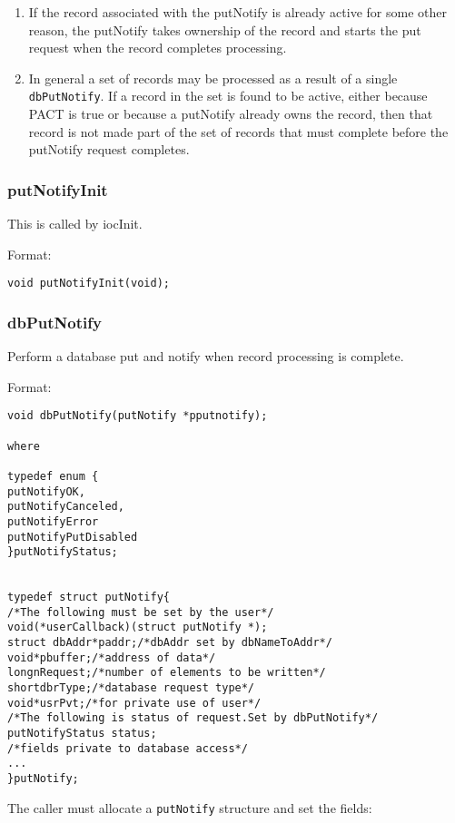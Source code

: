 \begin{enumerate}
\item If the record associated with the putNotify is already active for some other reason, the putNotify takes ownership of 
the record and starts the put request when the record completes processing.

\item In general a set of records may be processed as a result of a single \verb|dbPutNotify|. If a record in the set is found to 
be active, either because PACT is true or because a putNotify already owns the record, then that record is not made 
part of the set of records that must complete before the putNotify request completes.

\end{enumerate}\subsubsection{putNotifyInit}

This is called by iocInit.

Format:

\begin{verbatim}void putNotifyInit(void);
\end{verbatim}\subsubsection{dbPutNotify}

Perform a database put and notify when record processing is complete.

Format:

\begin{verbatim}void dbPutNotify(putNotify *pputnotify);

where

typedef enum {
putNotifyOK,
putNotifyCanceled,
putNotifyError
putNotifyPutDisabled
}putNotifyStatus;


typedef struct putNotify{
/*The following must be set by the user*/
void(*userCallback)(struct putNotify *);
struct dbAddr*paddr;/*dbAddr set by dbNameToAddr*/
void*pbuffer;/*address of data*/
longnRequest;/*number of elements to be written*/
shortdbrType;/*database request type*/
void*usrPvt;/*for private use of user*/
/*The following is status of request.Set by dbPutNotify*/
putNotifyStatus status;
/*fields private to database access*/
...
}putNotify;
\end{verbatim}
The caller must allocate a \verb|putNotify| structure and set the fields:

